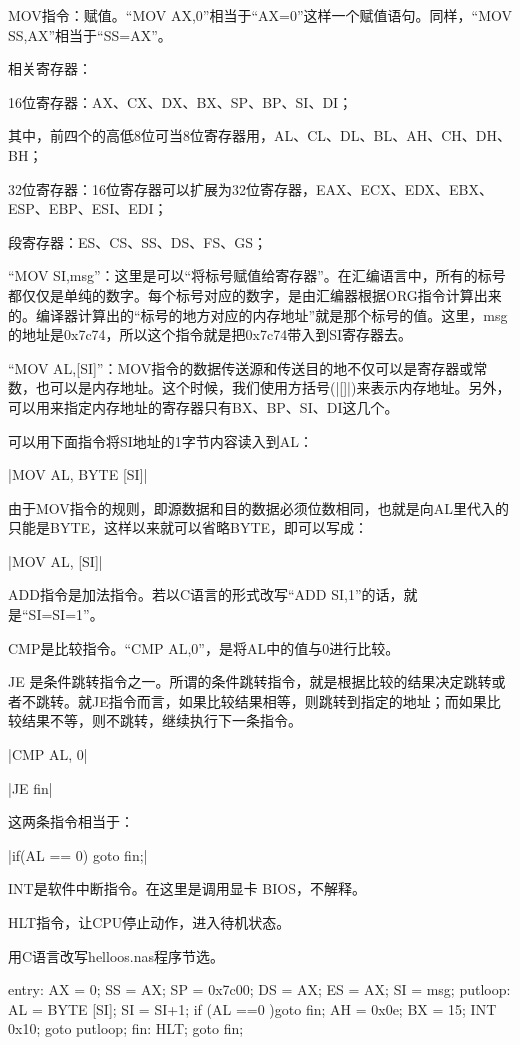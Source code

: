 MOV指令：赋值。“MOV AX,0”相当于“AX=0”这样一个赋值语句。同样，“MOV SS,AX”相当于“SS=AX”。
\cs

相关寄存器：

16位寄存器：AX、CX、DX、BX、SP、BP、SI、DI；

其中，前四个的高低8位可当8位寄存器用，AL、CL、DL、BL、AH、CH、DH、BH；

32位寄存器：16位寄存器可以扩展为32位寄存器，EAX、ECX、EDX、EBX、ESP、EBP、ESI、EDI；

段寄存器：ES、CS、SS、DS、FS、GS；
\cs

“MOV SI,msg”：这里是可以“将标号赋值给寄存器”。在汇编语言中，所有的标号都仅仅是单纯的数字。每个标号对应的数字，是由汇编器根据ORG指令计算出来的。编译器计算出的“标号的地方对应的内存地址”就是那个标号的值。这里，msg的地址是0x7c74，所以这个指令就是把0x7c74带入到SI寄存器去。

“MOV AL,[SI]”：MOV指令的数据传送源和传送目的地不仅可以是寄存器或常数，也可以是内存地址。这个时候，我们使用方括号(|[]|)来表示内存地址。另外，可以用来指定内存地址的寄存器只有BX、BP、SI、DI这几个。

可以用下面指令将SI地址的1字节内容读入到AL：

|MOV AL, BYTE [SI]|

由于MOV指令的规则，即源数据和目的数据必须位数相同，也就是向AL里代入的只能是BYTE，这样以来就可以省略BYTE，即可以写成：

|MOV AL, [SI]|
\cs

ADD指令是加法指令。若以C语言的形式改写“ADD SI,1”的话，就是“SI=SI=1”。

CMP是比较指令。“CMP AL,0”，是将AL中的值与0进行比较。

JE 是条件跳转指令之一。所谓的条件跳转指令，就是根据比较的结果决定跳转或者不跳转。就JE指令而言，如果比较结果相等，则跳转到指定的地址；而如果比较结果不等，则不跳转，继续执行下一条指令。

|CMP AL, 0|

|JE fin|

这两条指令相当于：

|if(AL == 0){ goto fin;}|
\cs

INT是软件中断指令。在这里是调用显卡 BIOS，不解释。
\cs

HLT指令，让CPU停止动作，进入待机状态。
\cs

用C语言改写helloos.nas程序节选。
\begin{code}
entry:
	AX = 0;
	SS = AX;
	SP = 0x7c00;
	DS = AX;
	ES = AX;
	SI = msg;
putloop:
	AL = BYTE [SI];
	SI = SI+1;
	if (AL ==0 ){goto fin;}
	AH = 0x0e;
	BX = 15;
	INT 0x10;
	goto putloop;
fin:
	HLT;
	goto fin;
\end{code}

